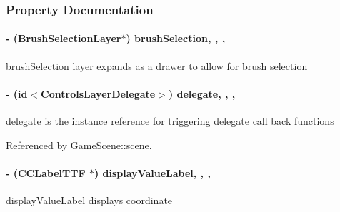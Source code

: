 \subsubsection{Property Documentation}
\hypertarget{interface_controls_layer_a56c514c5fde8025a9de19c4b8225478b}{
\paragraph[{brush\-Selection}]{\setlength{\rightskip}{0pt plus 5cm}-\/ ({\bf Brush\-Selection\-Layer}$\ast$) brush\-Selection\hspace{0.3cm}{\ttfamily [read]}, {\ttfamily [write]}, {\ttfamily [nonatomic]}, {\ttfamily [strong]}}}\label{d1/d1a/interface_controls_layer_a56c514c5fde8025a9de19c4b8225478b}
brush\-Selection layer expands as a drawer to allow for brush selection \hypertarget{interface_controls_layer_aebfe5471226d1bc0afef5d662219f913}{
\paragraph[{delegate}]{\setlength{\rightskip}{0pt plus 5cm}-\/ (id$<${\bf Controls\-Layer\-Delegate}$>$) delegate\hspace{0.3cm}{\ttfamily [read]}, {\ttfamily [write]}, {\ttfamily [nonatomic]}, {\ttfamily [weak]}}}\label{d1/d1a/interface_controls_layer_aebfe5471226d1bc0afef5d662219f913}
delegate is the instance reference for triggering delegate call back functions 

Referenced by Game\-Scene\-::scene.

\hypertarget{interface_controls_layer_ab9f12f7a90a0bf6ae1abaeb4d4c4e378}{
\paragraph[{display\-Value\-Label}]{\setlength{\rightskip}{0pt plus 5cm}-\/ (C\-C\-Label\-T\-T\-F $\ast$) display\-Value\-Label\hspace{0.3cm}{\ttfamily [read]}, {\ttfamily [write]}, {\ttfamily [nonatomic]}, {\ttfamily [strong]}}}\label{d1/d1a/interface_controls_layer_ab9f12f7a90a0bf6ae1abaeb4d4c4e378}
display\-Value\-Label displays coordinate

